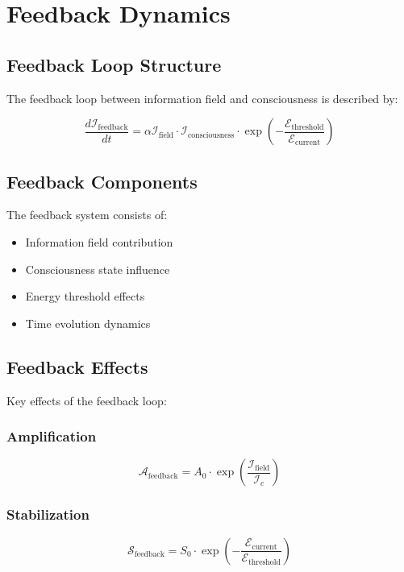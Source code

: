 \section{Feedback Dynamics}

\subsection{Feedback Loop Structure}

The feedback loop between information field and consciousness is described by:

\[
\frac{d\mathcal{I}_{\text{feedback}}}{dt} = \alpha \mathcal{I}_{\text{field}} \cdot \mathcal{I}_{\text{consciousness}} \cdot \exp\left(-\frac{\mathcal{E}_{\text{threshold}}}{\mathcal{E}_{\text{current}}}\right)
\]

\subsection{Feedback Components}

The feedback system consists of:

\begin{itemize}
    \item Information field contribution
    \item Consciousness state influence
    \item Energy threshold effects
    \item Time evolution dynamics
\end{itemize}

\subsection{Feedback Effects}

Key effects of the feedback loop:

\subsubsection{Amplification}
\[
\mathcal{A}_{\text{feedback}} = A_0 \cdot \exp\left(\frac{\mathcal{I}_{\text{field}}}{\mathcal{I}_c}\right)
\]

\subsubsection{Stabilization}
\[
\mathcal{S}_{\text{feedback}} = S_0 \cdot \exp\left(-\frac{\mathcal{E}_{\text{current}}}{\mathcal{E}_{\text{threshold}}}\right)
\]

